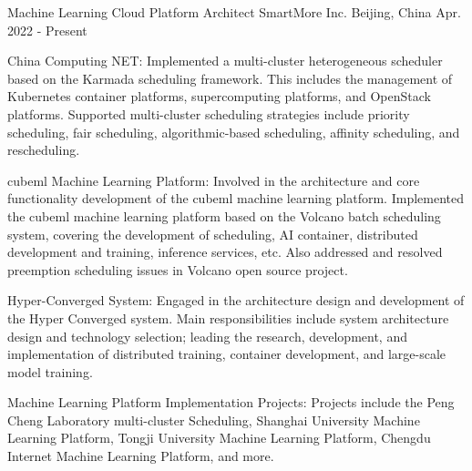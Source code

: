 

\begin{cventries}

  \cventry
    {Machine Learning Cloud Platform Architect} %
    {SmartMore Inc.} %
    {Beijing, China} %
    {Apr. 2022 - Present} %
    {
      \begin{cvitems} %
        \item {China Computing NET: Implemented a multi-cluster heterogeneous scheduler based on the Karmada scheduling framework. This includes the management of Kubernetes container platforms, supercomputing platforms, and OpenStack platforms. Supported multi-cluster scheduling strategies include priority scheduling, fair scheduling, algorithmic-based scheduling, affinity scheduling, and rescheduling.}
        \item {cubeml Machine Learning Platform: Involved in the architecture and core functionality development of the cubeml machine learning platform. Implemented the cubeml machine learning platform based on the Volcano batch scheduling system, covering the development of scheduling, AI container, distributed development and training, inference services, etc. Also addressed and resolved preemption scheduling issues in Volcano open source project.}
        \item {Hyper-Converged System: Engaged in the architecture design and development of the Hyper Converged system. Main responsibilities include system architecture design and technology selection; leading the research, development, and implementation of distributed training, container development, and large-scale model training.}
        \item {Machine Learning Platform Implementation Projects: Projects include the Peng Cheng Laboratory multi-cluster Scheduling, Shanghai University Machine Learning Platform, Tongji University Machine Learning Platform, Chengdu Internet Machine Learning Platform, and more.}
      \end{cvitems}
    }


\end{cventries}
